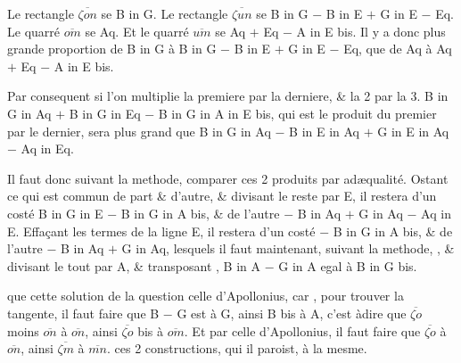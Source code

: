 \documentclass[11pt,a4paper]{article}
\begin{document}
Le rectangle $\overline{\zeta on}$ se  B in G. Le rectangle $\overline{\zeta un}$ se  B in G $-$ B in E $+$ G in E $-$ Eq. Le quarré $\overline{om}$ se  Aq. Et le quarré $\overline{um}$ se  Aq $+$ Eq $-$ A in E bis. Il y a donc plus grande \struck{\ill{}} proportion de B in G à B in G $-$ B in E $+$ G in E $-$ Eq, que de Aq à Aq $+$ Eq $-$ A in E bis.

Par consequent si l'on multiplie la premiere par la derniere, \& la 2 par la 3. B in G in Aq $+$ B in G in Eq $-$ B in G in A in E bis, qui est le produit du premier par le dernier, sera plus grand que B in G in Aq  $-$ B in E in Aq $+$ G in E in Aq $-$ Aq in Eq. 

Il faut donc suivant la  methode, comparer ces 2 produits par adæqualité. Ostant ce qui est commun de part \& d'autre, \& divisant le reste par E, il restera d'un costé B in G in E $-$ B in G in A bis, \& de l'autre $-$ B in Aq $+$ G in Aq $-$ Aq in E. Effaçant les termes  de la ligne E, il restera d'un costé $-$ B in G in A bis, \& de l'autre $-$ B in Aq $+$ G in Aq, lesquels il faut maintenant, suivant la  methode, , \& divisant le tout par A, \& transposant , B in A $-$ G in A egal à B in G bis.

 que cette solution de la question  celle d'Apollonius, car , pour trouver la tangente, il faut faire que B $-$ G est à G, ainsi B bis à A, c'est àdire que $\overline{\zeta o}$ moins $\overline{on}$ à $\overline{on}$, ainsi $\overline{\zeta o}$ bis à $\overline{om}$. Et par celle d'Apollonius, il faut faire que $\overline{\zeta o}$ à $\overline{on}$, ainsi $\overline{\zeta m}$ à $\overline{mn}$.  ces 2 constructions, qui il paroist,  à la mesme.
\end{document}
